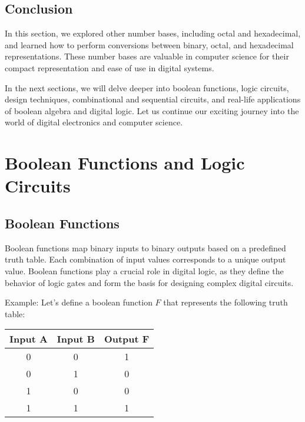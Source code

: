 \documentclass{article}
\begin{document}
\subsection{Conclusion}

In this section, we explored other number bases, including octal and hexadecimal, and learned how to perform conversions between binary, octal, and hexadecimal representations. These number bases are valuable in computer science for their compact representation and ease of use in digital systems.

In the next sections, we will delve deeper into boolean functions, logic circuits, design techniques, combinational and sequential circuits, and real-life applications of boolean algebra and digital logic. Let us continue our exciting journey into the world of digital electronics and computer science.

\newpage

\section{Boolean Functions and Logic Circuits}

\subsection{Boolean Functions}

Boolean functions map binary inputs to binary outputs based on a predefined truth table. Each combination of input values corresponds to a unique output value. Boolean functions play a crucial role in digital logic, as they define the behavior of logic gates and form the basis for designing complex digital circuits.

Example: Let's define a boolean function $F$ that represents the following truth table:

\begin{center}
  \begin{tabular}{|c|c|c|}
    \hline
    \textbf{Input A} & \textbf{Input B} & \textbf{Output F} \\
    \hline
    0 & 0 & 1 \\
    0 & 1 & 0 \\
    1 & 0 & 0 \\
    1 & 1 & 1 \\
    \hline
  \end{tabular}
\end{center}
\end{document}
